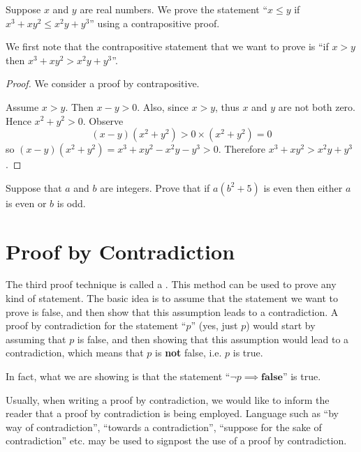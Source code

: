 \begin{example}
    Suppose $x$ and $y$ are real numbers. We prove the statement ``$x \leq y$ if $x^3 + xy^2 \leq x^2y + y^3$'' using a contrapositive proof.

    We first note that the contrapositive statement that we want to prove is ``if $x > y$ then $x^3 + xy^2 > x^2y + y^3$''.

    \begin{proof}
        We consider a proof by contrapositive.

        Assume $x > y$. Then $x - y > 0$. Also, since $x > y$, thus $x$ and $y$ are not both zero. Hence $x^2 + y^2 > 0$.
        Observe
        \[
            (x-y)(x^2+y^2) > 0 \times (x^2+y^2) = 0
        \]
        so $(x-y)(x^2+y^2) = x^3 + xy^2 - x^2y - y^3 > 0$. Therefore $x^3 + xy^2 > x^2y + y^3$.
    \end{proof}
\end{example}

\begin{exercise}
    Suppose that $a$ and $b$ are integers. Prove that if $a(b^2 + 5)$ is even then either $a$ is even or $b$ is odd.
\end{exercise}

\section{Proof by Contradiction}
The third proof technique is called a . This method can be used to prove any kind of statement. The basic idea is to assume that the statement we want to prove is false, and then show that this assumption leads to a contradiction. A proof by contradiction for the statement ``$p$'' (yes, just $p$) would start by assuming that $p$ is false, and then showing that this assumption would lead to a contradiction, which means that $p$ is \textbf{not} false, i.e. $p$ is true.
\begin{remark}
    In fact, what we are showing is that the statement ``$\lnot p \implies \textbf{false}$'' is true.
\end{remark}

Usually, when writing a proof by contradiction, we would like to inform the reader that a proof by contradiction is being employed. Language such as ``by way of contradiction'', ``towards a contradiction'', ``suppose for the sake of contradiction'' etc. may be used to signpost the use of a proof by contradiction.

